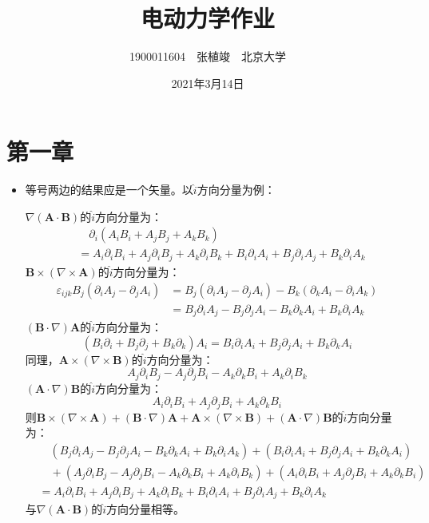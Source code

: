 \documentclass[a4paper,fontset=none]{ctexart}
\begin{document}
    \title{\textbf{电动力学作业}}
    \author{1900011604\ \ 张植竣\ \ 北京大学}
    \date{2021年3月14日}
    \maketitle

    \section*{第一章}

    \begin{itemize}

        \item[1.]
        \textparagraph 等号两边的结果应是一个矢量。以$\hat{i}$方向分量为例：

        $\nabla(\bm{A}\cdot\bm{B})$的$\hat{i}$方向分量为：
        \begin{align*}
            &\quad \partial_i(A_i B_i + A_j B_j + A_k B_k) \\
            &= A_i \partial_i B_i + A_j \partial_i B_j + A_k \partial_i B_k + B_i \partial_i A_i + B_j \partial_i A_j + B_k \partial_i A_k
        \end{align*}
        $\bm{B}\times(\nabla\times\bm{A})$的$\hat{i}$方向分量为：
        \begin{align*}
            \varepsilon_{ijk}B_j(\partial_i A_j - \partial_j A_i)
            &= B_j(\partial_i A_j - \partial_j A_i) - B_k(\partial_k A_i - \partial_i A_k) \\
            &= B_j\partial_i A_j - B_j\partial_j A_i - B_k\partial_k A_i + B_k\partial_i A_k
        \end{align*}
        $(\bm{B}\cdot\nabla)\bm{A}$的$\hat{i}$方向分量为：
        \[
            (B_i\partial_i + B_j\partial_j + B_k\partial_k)A_i = B_i\partial_i A_i + B_j\partial_j A_i + B_k\partial_k A_i
        \]
        同理，$\bm{A}\times(\nabla\times\bm{B})$的$\hat{i}$方向分量为：
        \[
            A_j\partial_i B_j - A_j\partial_j B_i - A_k\partial_k B_i + A_k\partial_i B_k
        \]
        $(\bm{A}\cdot\nabla)\bm{B}$的$\hat{i}$方向分量为：
        \[
            A_i\partial_i B_i + A_j\partial_j B_i + A_k\partial_k B_i
        \]
        则$\bm{B}\times(\nabla\times\bm{A}) + (\bm{B}\cdot\nabla)\bm{A} + \bm{A}\times(\nabla\times\bm{B}) + (\bm{A}\cdot\nabla)\bm{B}$的$\hat{i}$方向分量为：
        \begin{align*}
            &\quad (B_j\partial_i A_j - B_j\partial_j A_i - B_k\partial_k A_i + B_k\partial_i A_k) + (B_i\partial_i A_i + B_j\partial_j A_i + B_k\partial_k A_i) \\
            &\quad + (A_j\partial_i B_j - A_j\partial_j B_i - A_k\partial_k B_i + A_k\partial_i B_k) + (A_i\partial_i B_i + A_j\partial_j B_i + A_k\partial_k B_i) \\
            &= A_i \partial_i B_i + A_j \partial_i B_j + A_k \partial_i B_k + B_i \partial_i A_i + B_j \partial_i A_j + B_k \partial_i A_k
        \end{align*}
        与$\nabla(\bm{A}\cdot\bm{B})$的$\hat{i}$方向分量相等。


\end{itemize}
\end{document}

